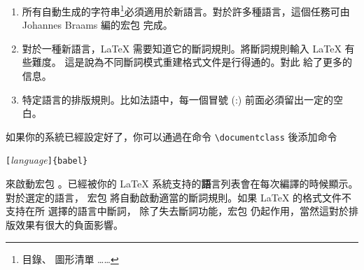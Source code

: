 \begin{enumerate}
\item  所有自動生成的字符串\footnote{目錄、 圖形清單
……}必須適用於新語言。對於許多種語言，這個任務可由 Johannes
  Braams 編的宏包  完成。
\item 對於一種新語言，\LaTeX{} 需要知道它的斷詞規則。將斷詞規則輸入 \LaTeX{} 有些難度。
這是說為不同斷詞模式重建格式文件是行得通的。對此 \guide{} 給了更多的信息。
\item
特定語言的排版規則。比如法語中，每一個冒號 (:) 前面必須留出一定的空白。
\end{enumerate}


如果你的系統已經設定好了，你可以通過在命令 \verb|\documentclass| 後添加命令
\begin{lscommand}
\verb|[|\emph{language}\verb|]{babel}|
\end{lscommand}
\noindent
來啟動宏包 。已經被你的 \LaTeX{} 系統支持的{\textbf
語言}列表會在每次編譯的時候顯示。對於選定的語言，
宏包  將自動啟動適當的斷詞規則。如果 \LaTeX{} 的格式文件不支持在所
選擇的語言中斷詞，
除了失去斷詞功能，宏包  仍起作用，當然這對於排版效果有很大的負面影響。

